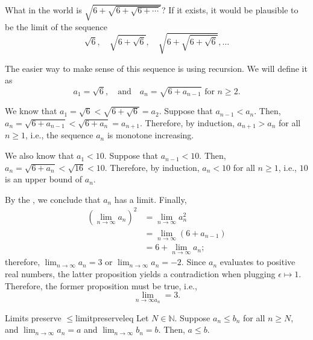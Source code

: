 \begin{exmp}{}{}
	What in the world is \(\sqrt{6 + \sqrt{6 + \sqrt{6 + \cdots}}}\)? If it exists, it would be plausible to be the limit of the sequence  \[
		\sqrt{6}, \quad \sqrt{6+\sqrt{6}}, \quad \sqrt{6 + \sqrt{6 + \sqrt{6}}}, \dots
	\]

	The easier way to make sense of this sequence is using recursion. We will define it as \[
		a_1 = \sqrt{6}, \quad \text{and} \quad a_n = \sqrt{6+a_{n-1}} \text{ for } n \geq 2.
	\]

	We know that \(a_1 = \sqrt{6} < \sqrt{6 + \sqrt{6}} = a_2\). Suppose that \(a_{n-1} < a_n\). Then, \(a_n = \sqrt{6 + a_{n-1}} < \sqrt{6 + a_n} = a_{n+1}\). Therefore, by induction,  \(a_{n+1} > a_n\) for all \(n \geq 1\), i.e., the sequence \(a_n\) is monotone increasing. 

	We also know that \(a_1 < 10\). Suppose that \(a_{n-1} < 10\). Then, \(a_n = \sqrt{6 + a_n} < \sqrt{16} < 10\). Therefore, by induction,  \(a_n < 10\) for all  \(n \geq 1\), i.e., \(10\) is an upper bound of \(a_n\).

	By the , we conclude that \(a_n\) has a limit. Finally, \begin{align*}
		\left(\lim_{n \to \infty} a_n\right)^2 &= \lim_{n\to\infty} a_n^2 \\
											   &= \lim_{n\to\infty} \left(6 + a_{n-1}\right) \\
											   &= 6 + \lim_{n\to\infty} a_n;
	\end{align*}
	therefore, \(\lim_{n\to\infty}a_n = 3\) or  \(\lim_{n\to\infty}a_n = -2\). Since \(a_n\) evaluates to positive real numbers, the latter proposition yields a contradiction when plugging \(\epsilon \mapsto 1\). Therefore, the former proposition must be true, i.e.,  \[
		\lim_{n\to\infty a_n} = 3.
	\]
\end{exmp}

\begin{thm}{Limits preserve \(\leq\)}{limitpreserveleq}
	Let \(N \in \mathbb{N}\). Suppose \(a_n \leq b_n\) for all \(n \geq N\), and \(\lim_{n\to\infty} a_n = a\) and \(\lim_{n\to\infty} b_n = b\). Then, \(a \leq b\).
\end{thm}
